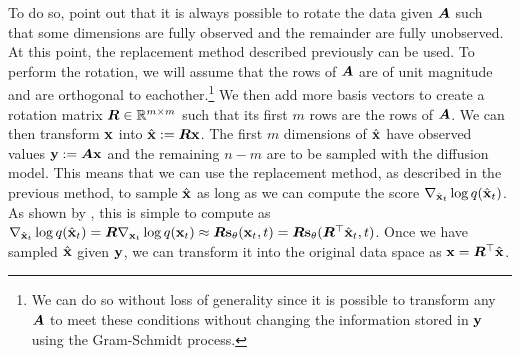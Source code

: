 To do so, \citet{song2020score} point out that it is always possible to rotate the data given ${\bm{A}}$ such that some dimensions are fully observed and the remainder are fully unobserved. At this point, the replacement method described previously can be used. To perform the rotation, we will assume that the rows of ${\bm{A}}$ are of unit magnitude and are orthogonal to eachother.\footnote{We can do so without loss of generality since it is possible to transform any ${\bm{A}}$ to meet these conditions without changing the information stored in ${\mathbf{y}}$ using the Gram-Schmidt process.} We then add more basis vectors to create a rotation matrix ${\bm{R}} \in \mathbb{R}^{m \times m}$ such that its first $m$ rows are the rows of ${\bm{A}}$. We can then transform ${\mathbf{x}}$ into $\hat{{\mathbf{x}}} := {\bm{R}} {\mathbf{x}}$. The first $m$ dimensions of $\hat{{\mathbf{x}}}$ have observed values ${\mathbf{y}} := {\bm{A}}{\mathbf{x}}$ and the remaining $n-m$ are to be sampled with the diffusion model. This means that we can use the replacement method, as described in the previous method, to sample $\hat{{\mathbf{x}}}$ as long as we can compute the score $\nabla_{\hat{{\mathbf{x}}}_t} \log q(\hat{{\mathbf{x}}}_t)$. As shown by \citet{song2020score}, this is simple to compute as $\nabla_{\hat{{\mathbf{x}}}_t} \log q(\hat{{\mathbf{x}}}_t) = {\bm{R}} \nabla_{{\mathbf{x}}_t} \log q({\mathbf{x}}_t) \approx {\bm{R}} {\mathbf{s}}_\theta({\mathbf{x}}_t, t) = {\bm{R}} {\mathbf{s}}_\theta({\bm{R}}^\top \hat{{\mathbf{x}}}_t, t)$. Once we have sampled $\hat{{\mathbf{x}}}$ given ${\mathbf{y}}$, we can transform it into the original data space as ${\mathbf{x}} = {\bm{R}}^\top \hat{{\mathbf{x}}}$.

